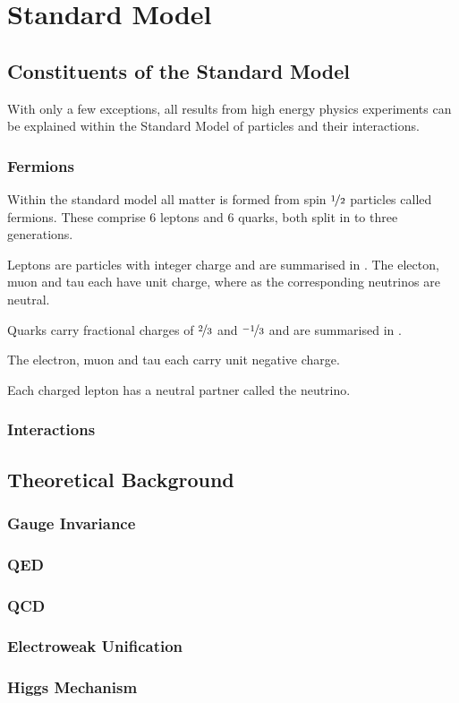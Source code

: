 \chapter{Standard Model}


\section{Constituents of the Standard Model}
With only a few exceptions, all results from high energy physics experiments can
be explained within the Standard Model of particles and their interactions.

\subsection{Fermions}
Within the standard model all matter is formed from spin $\nicefrac{1}{2}$
particles called fermions.  These comprise 6 leptons and 6 quarks, both split in
to three generations.

Leptons are particles with integer charge and are summarised in \TableRef{}. The
electon, muon and tau each have unit charge, where as the corresponding
neutrinos are neutral. 

Quarks carry fractional charges of $\nicefrac{2}{3}$ and $\nicefrac{-1}{3}$ and
are summarised in \TableRef{}. 


The electron, muon and tau each carry unit negative charge. 

Each charged lepton has a neutral partner called the neutrino. 

\subsection{Interactions}

\section{Theoretical Background}

\subsection{Gauge Invariance}

\subsection{QED}

\subsection{QCD}

\subsection{Electroweak Unification}

\subsection{Higgs Mechanism}



